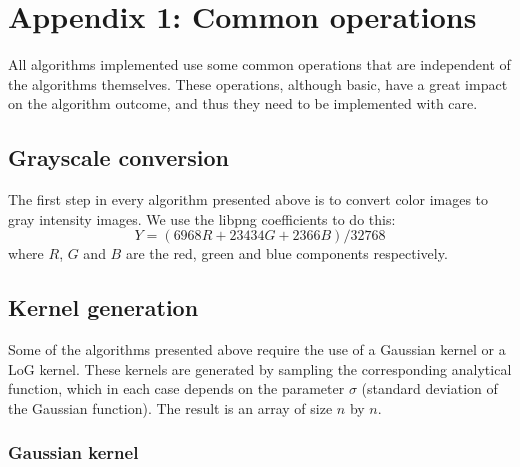 \documentclass{ipol}
\numberwithin{equation}{section}
\numberwithin{table}{section}
\numberwithin{figure}{section}
\begin{document}



\clearpage
\section{Appendix 1: Common operations}
\label{sec:appendix1}

All algorithms implemented use some common operations that are independent of the algorithms themselves. 
These operations, although basic, have a great impact on the algorithm outcome, and thus they need to be 
implemented with care.\\

\subsection{Grayscale conversion}

The first step in every algorithm presented above is to convert color images to gray intensity images. 
We use the libpng coefficients to do this:
\begin{equation}
    Y = (6968 R + 23434 G + 2366 B) / 32768
\end{equation}
where $R$, $G$ and $B$ are the red, green and blue components respectively.\\

\subsection{Kernel generation}
\label{sec:appendix2}

Some of the algorithms presented above require the use of a Gaussian kernel or a LoG kernel. These 
kernels are generated by sampling the corresponding analytical function, which in each case depends 
on the parameter $\sigma$ (standard deviation of the Gaussian function). The result is an array of 
size $n$ by $n$.\\

\subsubsection{Gaussian kernel}
\end{document}
